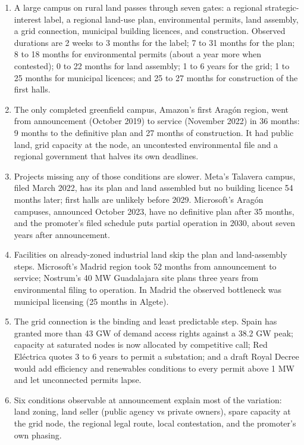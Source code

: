 \documentclass[11pt]{article}
\begin{document}
\begin{enumerate}[leftmargin=*]
\item A large campus on rural land passes through seven gates: a regional strategic-interest label, a regional land-use plan, environmental permits, land assembly, a grid connection, municipal building licences, and construction. Observed durations are 2 weeks to 3 months for the label; 7 to 31 months for the plan; 8 to 18 months for environmental permits (about a year more when contested); 0 to 22 months for land assembly; 1 to 6 years for the grid; 1 to 25 months for municipal licences; and 25 to 27 months for construction of the first halls.
\item The only completed greenfield campus, Amazon's first Aragón region, went from announcement (October 2019) to service (November 2022) in 36 months: 9 months to the definitive plan and 27 months of construction. It had public land, grid capacity at the node, an uncontested environmental file and a regional government that halves its own deadlines.
\item Projects missing any of those conditions are slower. Meta's Talavera campus, filed March 2022, has its plan and land assembled but no building licence 54 months later; first halls are unlikely before 2029. Microsoft's Aragón campuses, announced October 2023, have no definitive plan after 35 months, and the promoter's filed schedule puts partial operation in 2030, about seven years after announcement.
\item Facilities on already-zoned industrial land skip the plan and land-assembly steps. Microsoft's Madrid region took 52 months from announcement to service; Nostrum's 40 MW Guadalajara site plans three years from environmental filing to operation. In Madrid the observed bottleneck was municipal licensing (25 months in Algete).
\item The grid connection is the binding and least predictable step. Spain has granted more than 43 GW of demand access rights against a 38.2 GW peak; capacity at saturated nodes is now allocated by competitive call; Red Eléctrica quotes 3 to 6 years to permit a substation; and a draft Royal Decree would add efficiency and renewables conditions to every permit above 1 MW and let unconnected permits lapse.
\item Six conditions observable at announcement explain most of the variation: land zoning, land seller (public agency vs private owners), spare capacity at the grid node, the regional legal route, local contestation, and the promoter's own phasing.

\end{enumerate}
\end{document}
